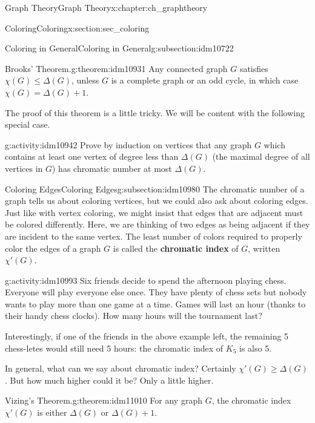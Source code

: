 \documentclass[oneside,10pt,]{book}
\newcommand{\terminology}[1]{\textbf{#1}}
\numberwithin{equation}{chapter}
\begin{document}
\begin{chapterptx}{Graph Theory}{}{Graph Theory}{}{}{x:chapter:ch_graphtheory}
\begin{sectionptx}{Coloring}{}{Coloring}{}{}{x:section:sec_coloring}
\begin{subsectionptx}{Coloring in General}{}{Coloring in General}{}{}{g:subsection:idm10722}
\begin{theorem}{Brooks' Theorem.}{}{g:theorem:idm10931}%
 Any connected graph \(G\) satisfies \(\chi(G) \le \Delta(G)\), unless \(G\) is a complete graph or an odd cycle, in which case \(\chi(G) = \Delta(G) + 1\).%
\end{theorem}
The proof of this theorem is a little tricky.  We will be content with the following special case.%
\begin{activity}{}{g:activity:idm10942}%
Prove by induction on vertices that any graph \(G\) which contains at least one vertex of degree less than \(\Delta(G)\) (the maximal degree of all vertices in \(G\)) has chromatic number at most \(\Delta(G)\).%
\end{activity}
\end{subsectionptx}
%
%
\typeout{************************************************}
\typeout{************************************************}
%
\begin{subsectionptx}{Coloring Edges}{}{Coloring Edges}{}{}{g:subsection:idm10980}
The chromatic number of a graph tells us about coloring vertices, but we could also ask about coloring edges. Just like with vertex coloring, we might insist that edges that are adjacent must be colored differently. Here, we are thinking of two edges as being adjacent if they are incident to the same vertex. The least number of colors required to properly color the edges of a graph \(G\) is called the \terminology{chromatic index} of \(G\), written \(\chi'(G)\)\label{g:notation:idm10989}.%
\begin{activity}{}{g:activity:idm10993}%
Six friends decide to spend the afternoon playing chess. Everyone will play everyone else once. They have plenty of chess sets but nobody wants to play more than one game at a time. Games will last an hour (thanks to their handy chess clocks). How many hours will the tournament last?%
\end{activity}
Interestingly, if one of the friends in the above example left, the remaining 5 chess-letes would still need 5 hours: the chromatic index of \(K_5\) is also 5.%
\par
In general, what can we say about chromatic index? Certainly \(\chi'(G) \ge \Delta(G)\). But how much higher could it be? Only a little higher.%
\begin{theorem}{Vizing's Theorem.}{}{g:theorem:idm11010}%
 For any graph \(G\), the chromatic index \(\chi'(G)\) is either \(\Delta(G)\) or \(\Delta(G) + 1\).%

\end{theorem}
\end{subsectionptx}
\end{sectionptx}
\end{chapterptx}
\end{document}
